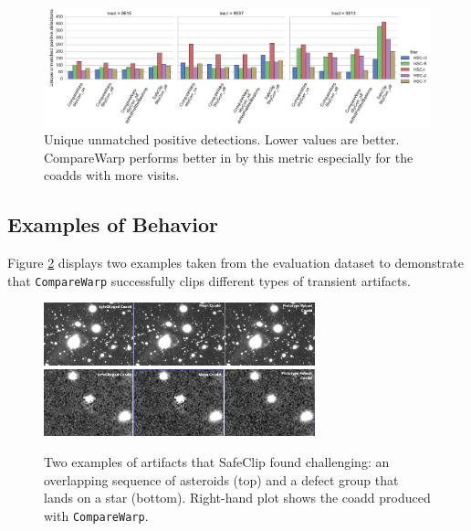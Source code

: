 \documentclass[DM,authoryear,toc]{lsstdoc}
\begin{document}
\begin{figure}
\begin{centering}
\includegraphics[width=1.0\textwidth]{figures/missed_uniquePosDet.pdf}
\par\end{centering}
\caption{\label{fig:uniquePosDet} Unique unmatched positive detections. Lower values are better. CompareWarp performs better in by this metric especially for the coadds with more visits.}
\end{figure}

\subsection{Examples of Behavior}
Figure \ref{fig:old_examples} displays two examples taken from the evaluation dataset to demonstrate that \texttt{CompareWarp} successfully clips different types of transient artifacts.

\begin{figure}
\begin{centering}
\includegraphics[width=0.7\textwidth]{figures/prototypeRobustAsteroids.png}
\includegraphics[width=0.7\textwidth]{figures/PrototypeRobustDetect1.png}
\par\end{centering}
\caption{\label{fig:old_examples} Two examples of artifacts that SafeClip found challenging: an overlapping sequence of asteroids (top) and a defect group that lands on a star (bottom).  Right-hand plot shows the coadd produced with \texttt{CompareWarp}.}
\end{figure}
\end{document}
